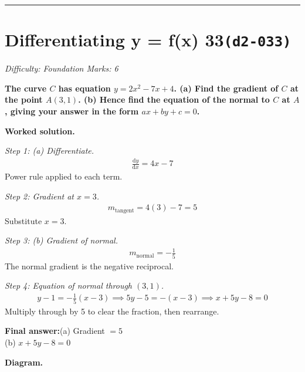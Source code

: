 \documentclass[11pt]{article}
\newcommand{\question}[1]{\par\medskip\noindent\textbf{#1}\par}
\begin{document}
\medskip\hrule

\section*{Differentiating y = f(x) 33\quad\small\texttt{(d2-033)}}
\textit{Difficulty: Foundation \quad\textbar\quad Marks: 6}

\question{The curve \( C \) has equation \( y = 2x^2 - 7x + 4 \). (a) Find the gradient of \( C \) at the point \( A(3, 1) \). (b) Hence find the equation of the normal to \( C \) at \( A \), giving your answer in the form \( ax + by + c = 0 \).}

\textbf{Worked solution.}

\textit{Step 1: (a) Differentiate.}
\[\begin{gathered}
\frac{\mathrm{d}y}{\mathrm{d}x} = 4x - 7
\end{gathered}\]
Power rule applied to each term.

\textit{Step 2: Gradient at \( x = 3 \).}
\[\begin{gathered}
m_{\text{tangent}} = 4(3) - 7 = 5
\end{gathered}\]
Substitute \( x = 3 \).

\textit{Step 3: (b) Gradient of normal.}
\[\begin{gathered}
m_{\text{normal}} = -\frac{1}{5}
\end{gathered}\]
The normal gradient is the negative reciprocal.

\textit{Step 4: Equation of normal through \( (3, 1) \).}
\[\begin{gathered}
y - 1 = -\tfrac{1}{5}(x - 3) \implies 5y - 5 = -(x - 3) \implies x + 5y - 8 = 0
\end{gathered}\]
Multiply through by 5 to clear the fraction, then rearrange.

\begin{answerbox}
\textbf{Final answer:}\quad (a) Gradient \(\displaystyle  = 5 \) \\[3pt]  (b) \(\displaystyle  x + 5y - 8 = 0 \)
\end{answerbox}
\textbf{Diagram.}
\end{document}
